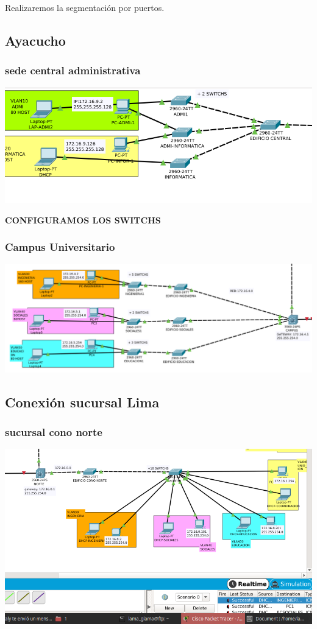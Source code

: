 Realizaremos la segmentaci\'on por puertos.\\
\subsection{Ayacucho}

\subsubsection{sede central administrativa}
\includegraphics[scale=0.52]{img/vlancentral.png} 

\textbf{CONFIGURAMOS LOS SWITCHS}
 
 \subsubsection{Campus Universitario}
\includegraphics[scale=0.35]{img/VLANCAMPUS.png} 
\subsection{Conexi\'on sucursal Lima}
\subsubsection{sucursal cono norte}
\includegraphics[scale=0.45]{img/VLANNORTE.png} \\
